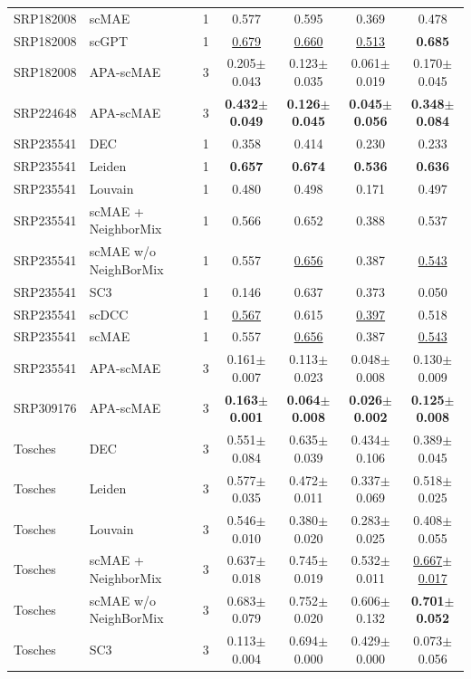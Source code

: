 \begin{table}[t]
\begin{tabular}{llrcccc}
SRP182008 & scMAE & 1 & 0.577 & 0.595 & 0.369 & 0.478 \\
SRP182008 & scGPT & 1 & \underline{0.679} & \underline{0.660} & \underline{0.513} & \textbf{0.685} \\
SRP182008 & APA-scMAE & 3 & 0.205$\pm$0.043 & 0.123$\pm$0.035 & 0.061$\pm$0.019 & 0.170$\pm$0.045 \\
\midrule
SRP224648 & APA-scMAE & 3 & \textbf{0.432$\pm$0.049} & \textbf{0.126$\pm$0.045} & \textbf{0.045$\pm$0.056} & \textbf{0.348$\pm$0.084} \\
\midrule
SRP235541 & DEC & 1 & 0.358 & 0.414 & 0.230 & 0.233 \\
SRP235541 & Leiden & 1 & \textbf{0.657} & \textbf{0.674} & \textbf{0.536} & \textbf{0.636} \\
SRP235541 & Louvain & 1 & 0.480 & 0.498 & 0.171 & 0.497 \\
SRP235541 & scMAE + NeighborMix & 1 & 0.566 & 0.652 & 0.388 & 0.537 \\
SRP235541 & scMAE w/o NeighBorMix & 1 & 0.557 & \underline{0.656} & 0.387 & \underline{0.543} \\
SRP235541 & SC3 & 1 & 0.146 & 0.637 & 0.373 & 0.050 \\
SRP235541 & scDCC & 1 & \underline{0.567} & 0.615 & \underline{0.397} & 0.518 \\
SRP235541 & scMAE & 1 & 0.557 & \underline{0.656} & 0.387 & \underline{0.543} \\
SRP235541 & APA-scMAE & 3 & 0.161$\pm$0.007 & 0.113$\pm$0.023 & 0.048$\pm$0.008 & 0.130$\pm$0.009 \\
\midrule
SRP309176 & APA-scMAE & 3 & \textbf{0.163$\pm$0.001} & \textbf{0.064$\pm$0.008} & \textbf{0.026$\pm$0.002} & \textbf{0.125$\pm$0.008} \\
\midrule
Tosches & DEC & 3 & 0.551$\pm$0.084 & 0.635$\pm$0.039 & 0.434$\pm$0.106 & 0.389$\pm$0.045 \\
Tosches & Leiden & 3 & 0.577$\pm$0.035 & 0.472$\pm$0.011 & 0.337$\pm$0.069 & 0.518$\pm$0.025 \\
Tosches & Louvain & 3 & 0.546$\pm$0.010 & 0.380$\pm$0.020 & 0.283$\pm$0.025 & 0.408$\pm$0.055 \\
Tosches & scMAE + NeighborMix & 3 & 0.637$\pm$0.018 & 0.745$\pm$0.019 & 0.532$\pm$0.011 & \underline{0.667$\pm$0.017} \\
Tosches & scMAE w/o NeighBorMix & 3 & 0.683$\pm$0.079 & 0.752$\pm$0.020 & 0.606$\pm$0.132 & \textbf{0.701$\pm$0.052} \\
Tosches & SC3 & 3 & 0.113$\pm$0.004 & 0.694$\pm$0.000 & 0.429$\pm$0.000 & 0.073$\pm$0.056 \\

\end{tabular}
\end{table}
